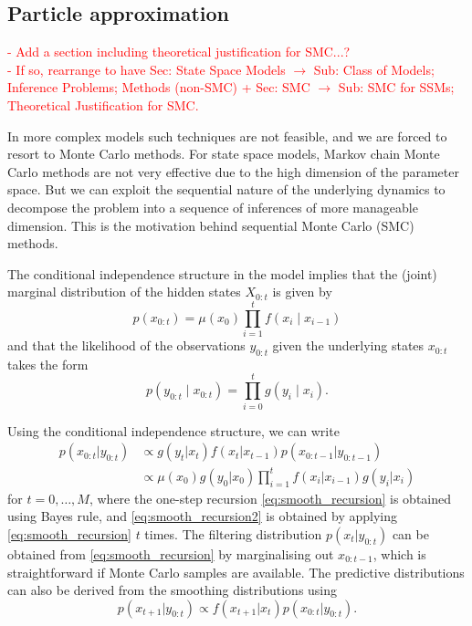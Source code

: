 \documentclass[fleqn]{article}
\theoremstyle{definition}
\begin{document}
\subsection{Particle approximation}
\textcolor{red}{
- Add a section including theoretical justification for SMC...?\\
- If so, rearrange to have Sec: State Space Models $\rightarrow$ Sub: Class of Models; Inference Problems; Methods (non-SMC) + Sec: SMC $\rightarrow$ Sub: SMC for SSMs; Theoretical Justification for SMC.\\
}

In more complex models such techniques are not feasible, and we are forced to resort to Monte Carlo methods.
For state space models, Markov chain Monte Carlo methods are not very effective due to the high dimension of the parameter space. But we can exploit the sequential nature of the underlying dynamics to decompose the problem into a sequence of inferences of more manageable dimension.
This is the motivation behind sequential Monte Carlo (SMC) methods.

The conditional independence structure in the model implies that the (joint) marginal distribution of the hidden states $X_{0:t}$ is given by
\begin{equation*} \label{eq:hmm_marginal}
p(x_{0:t}) = \mu(x_0) \prod_{i=1}^t f(x_i \mid x_{i-1})
\end{equation*}
and that the likelihood of the observations $y_{0:t}$ given the underlying states $x_{0:t}$ takes the form
\begin{equation*} \label{eq:hmm_likelihood}
p(y_{0:t} \mid x_{0:t}) = \prod_{i=0}^t g(y_i \mid x_i).
\end{equation*}

Using the conditional independence structure, we can write
\begin{align}
p(x_{0:t} | y_{0:t}) &\propto g(y_t | x_t) f(x_t | x_{t-1}) p(x_{0:t-1} | y_{0:t-1}) \label{eq:smooth_recursion}\\
&\propto \mu(x_0) g(y_0 | x_0) \prod_{i=1}^t f(x_i | x_{i-1}) g(y_i | x_i) \label{eq:smooth_recursion2}
\end{align}
for $t = 0,\dots,M$, where the one-step recursion \eqref{eq:smooth_recursion} is obtained using Bayes rule, and \eqref{eq:smooth_recursion2} is obtained by applying \eqref{eq:smooth_recursion} $t$ times. 
The filtering distribution $p(x_t | y_{0:t})$ can be obtained from \eqref{eq:smooth_recursion} by marginalising out $x_{0:t-1}$, which is straightforward if Monte Carlo samples are available.
The predictive distributions can also be derived from the smoothing distributions using
\begin{equation*}
p(x_{t+1} | y_{0:t}) \propto f(x_{t+1} | x_t) p(x_{0:t} | y_{0:t}).
\end{equation*}
\end{document}
